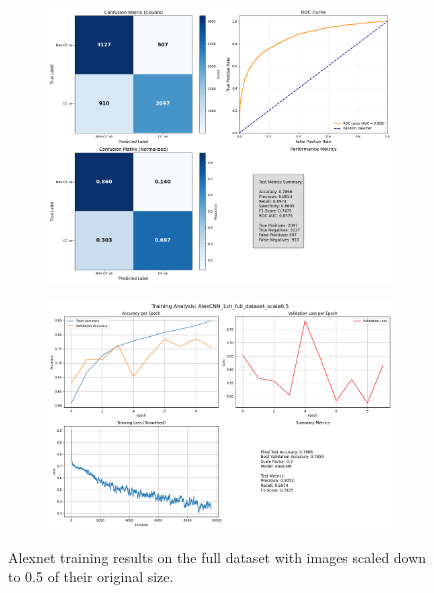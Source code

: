 \documentclass{pracalicmgr}
\begin{document}
\newpage

\begin{figure}[H]
    \centering
    \begin{subfigure}{0.9\textwidth}
        \centering
        \includegraphics[width=\textwidth]{src/AlexCNN_1ch_full_dataset_scale05.png}
        \label{fig:full5sub1}
    \end{subfigure}
    
    \vspace{1cm}
    
    \begin{subfigure}{0.9\textwidth}
        \centering
        \includegraphics[width=\textwidth]{src/AlexCNN_1ch_full_dataset_scale05loss.png}
        \label{fig:full5sub2}
    \end{subfigure}
    \caption{Alexnet training results on the full dataset with images scaled down to 0.5 of their original size.}
    \label{fig:full5stacked}
\end{figure}
\end{document}
